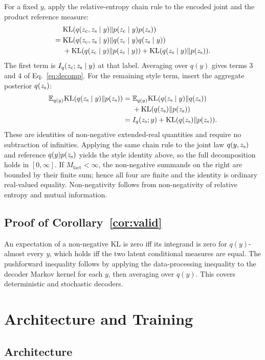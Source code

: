 For a fixed $y$, apply the relative-entropy chain rule to the encoded joint
and the product reference measure:
\begin{align}
&\mathrm{KL}\!\left(q(z_{\mathrm{c}},z_{\mathrm{s}}\mid y)\|p(z_{\mathrm{c}}\mid y)p(z_{\mathrm{s}})\right)\\
={}&\mathrm{KL}\!\left(q(z_{\mathrm{c}},z_{\mathrm{s}}\mid y)\|q(z_{\mathrm{c}}\mid y)q(z_{\mathrm{s}}\mid y)\right)\nonumber\\
&+\mathrm{KL}(q(z_{\mathrm{c}}\mid y)\|p(z_{\mathrm{c}}\mid y))
+\mathrm{KL}(q(z_{\mathrm{s}}\mid y)\|p(z_{\mathrm{s}})).
\end{align}
The first term is $I_q(z_{\mathrm{c}};z_{\mathrm{s}}\mid y)$ at that label.  Averaging over
$q(y)$ gives terms 3 and 4 of Eq.~\ref{eq:decomp}.  For the remaining style term,
insert the aggregate posterior $q(z_{\mathrm{s}})$:
\begin{align}
\mathbb E_{q(y)}\mathrm{KL}(q(z_{\mathrm{s}}\mid y)\|p(z_{\mathrm{s}}))
={}&\mathbb E_{q(y)}\mathrm{KL}(q(z_{\mathrm{s}}\mid y)\|q(z_{\mathrm{s}}))\nonumber\\
&+\mathrm{KL}(q(z_{\mathrm{s}})\|p(z_{\mathrm{s}}))\\
={}&I_q(z_{\mathrm{s}};y)+\mathrm{KL}(q(z_{\mathrm{s}})\|p(z_{\mathrm{s}})).
\end{align}
These are identities of non-negative extended-real quantities and require no
subtraction of infinities.  Applying the same chain rule to the joint law
$q(y,z_{\mathrm{s}})$ and reference $q(y)p(z_{\mathrm{s}})$ yields the style identity above, so the
full decomposition holds in $[0,\infty]$.  If $M_{\mathrm{fact}}<\infty$, the
non-negative summands on the right are bounded by their finite sum; hence all
four are finite and the identity is ordinary real-valued equality.
Non-negativity follows from non-negativity of relative entropy and mutual
information.

\subsection{Proof of Corollary~\ref{cor:valid}}

An expectation of a non-negative KL is zero iff its integrand is zero for
$q(y)$-almost every $y$, which holds iff the two latent conditional measures
are equal.  The pushforward inequality follows by applying the data-processing
inequality to the decoder Markov kernel for each $y$, then averaging over
$q(y)$.  This covers deterministic and stochastic decoders.

\section{Architecture and Training}
\label{app:model}

\subsection{Architecture}

